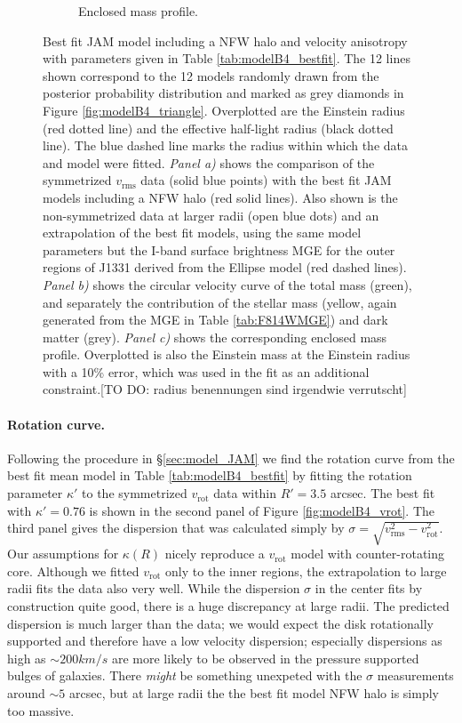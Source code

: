 \begin{figure}
\begin{subfigure}{.48\textwidth}
  \caption{Enclosed mass profile.}
  \label{fig:modelB4_enclMass}
\end{subfigure}
\caption{Best fit JAM model including a NFW halo and velocity anisotropy with parameters given in Table \ref{tab:modelB4_bestfit}. The 12 lines shown correspond to the 12 models randomly drawn from the posterior probability distribution and marked as grey diamonds in Figure \ref{fig:modelB4_triangle}. Overplotted are the Einstein radius (red dotted line) and the effective half-light radius (black dotted line). The blue dashed line marks the radius within which the data and model were fitted. \emph{Panel a)} shows the comparison of the symmetrized $v_\text{rms}$ data (solid blue points) with the best fit JAM models including a NFW halo (red solid lines). Also shown is the non-symmetrized data at larger radii (open blue dots) and an extrapolation of the best fit models, using the same model parameters but the I-band surface brightness MGE for the outer regions of J1331 derived from the Ellipse model (red dashed lines). \emph{Panel b)} shows the circular velocity curve of the total mass (green), and separately the contribution of the stellar mass (yellow, again generated from the MGE in Table \ref{tab:F814WMGE}) and dark matter (grey). \emph{Panel c)} shows the corresponding enclosed mass profile. Overplotted is also the Einstein mass at the Einstein radius with a 10\% error, which was used in the fit as an additional constraint.[TO DO: radius benennungen sind irgendwie verrutscht]}
\label{fig:modelB4_models}
\end{figure}



\paragraph{Rotation curve.} Following the procedure in \S\ref{sec:model_JAM} we find the rotation curve from the best fit mean model in Table \ref{tab:modelB4_bestfit} by fitting the rotation parameter $\kappa'$ to the symmetrized $v_\text{rot}$ data within $R' = 3.5$ arcsec. The best fit with $\kappa' = 0.76$ is shown in the second panel of Figure \ref{fig:modelB4_vrot}. The third panel gives the dispersion that was calculated simply by $\sigma = \sqrt{v_\text{rms}^2 - v_\text{rot}^2}$. Our assumptions for $\kappa(R)$ nicely reproduce a $v_\text{rot}$ model with counter-rotating core. Although we fitted $v_\text{rot}$ only to the inner regions, the extrapolation to large radii fits the data also very well. While the dispersion $\sigma$ in the center fits by construction quite good, there is a huge discrepancy at large radii. The predicted dispersion is much larger than the data; we would expect the disk rotationally supported and therefore have a low velocity dispersion; especially dispersions as high as $\sim 200 km/s$ are more likely to be observed in the pressure supported bulges of galaxies. There \emph{might} be something unexpeted with the $\sigma$ measurements around $\sim 5$ arcsec, but at large radii the the best fit model NFW halo is simply too massive. 


